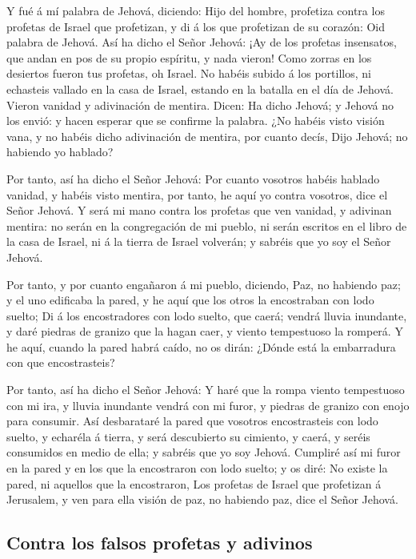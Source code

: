 Y fué á mí palabra de Jehová, diciendo:  Hijo
del hombre, profetiza contra los profetas de Israel que profetizan, y di
á los que profetizan de su corazón: Oid palabra de Jehová. 
Así ha dicho el Señor Jehová: ¡Ay de los profetas insensatos, que andan
en pos de su propio espíritu, y nada vieron!  Como zorras en
los desiertos fueron tus profetas, oh Israel.  No habéis
subido á los portillos, ni echasteis vallado en la casa de Israel,
estando en la batalla en el día de Jehová.  Vieron vanidad y
adivinación de mentira. Dicen: Ha dicho Jehová; y Jehová no los envió: y
hacen esperar que se confirme la palabra.  ¿No habéis visto
visión vana, y no habéis dicho adivinación de mentira, por cuanto decís,
Dijo Jehová; no habiendo yo hablado?

 Por tanto, así ha dicho el Señor Jehová: Por cuanto
vosotros habéis hablado vanidad, y habéis visto mentira, por tanto, he
aquí yo contra vosotros, dice el Señor Jehová.  Y será mi
mano contra los profetas que ven vanidad, y adivinan mentira: no serán
en la congregación de mi pueblo, ni serán escritos en el libro de la
casa de Israel, ni á la tierra de Israel volverán; y sabréis que yo soy
el Señor Jehová.

 Por tanto, y por cuanto engañaron á mi pueblo, diciendo,
Paz, no habiendo paz; y el uno edificaba la pared, y he aquí que los
otros la encostraban con lodo suelto;  Di á los
encostradores con lodo suelto, que caerá; vendrá lluvia inundante, y
daré piedras de granizo que la hagan caer, y viento tempestuoso la
romperá.  Y he aquí, cuando la pared habrá caído, no os
dirán: ¿Dónde está la embarradura con que encostrasteis?

 Por tanto, así ha dicho el Señor Jehová: Y haré que la
rompa viento tempestuoso con mi ira, y lluvia inundante vendrá con mi
furor, y piedras de granizo con enojo para consumir.  Así
desbarataré la pared que vosotros encostrasteis con lodo suelto, y
echaréla á tierra, y será descubierto su cimiento, y caerá, y seréis
consumidos en medio de ella; y sabréis que yo soy Jehová. 
Cumpliré así mi furor en la pared y en los que la encostraron con lodo
suelto; y os diré: No existe la pared, ni aquellos que la encostraron,
 Los profetas de Israel que profetizan á Jerusalem, y ven
para ella visión de paz, no habiendo paz, dice el Señor Jehová.

\hypertarget{contra-los-falsos-profetas-y-adivinos}{%
\subsection{Contra los falsos profetas y
adivinos}\label{contra-los-falsos-profetas-y-adivinos}}

